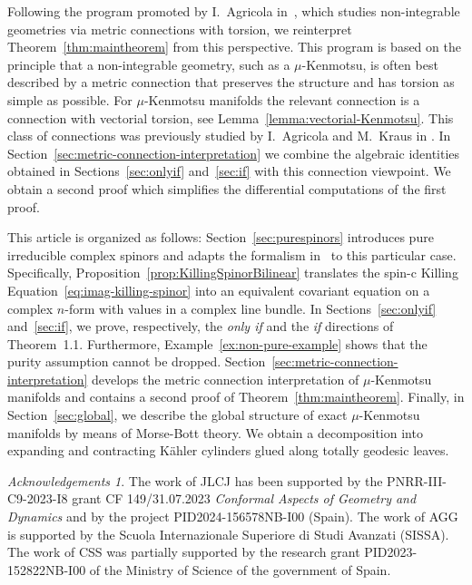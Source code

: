 \documentclass[10pt,a4paper,twoside,reqno]{amsart}
\theoremstyle{plain}
\theoremstyle{definition}
\theoremstyle{remark}
\newtheorem*{ack}{Acknowledgements}
\begin{document}
\noindent
Following the program promoted by I.~Agricola in~\cite{A2006}, which studies non-integrable geometries via metric connections with torsion, we reinterpret Theorem~\ref{thm:maintheorem} from this perspective. This program is based on the principle that a non-integrable geometry, such as a $\mu$-Kenmotsu, is often best described by a metric connection that preserves the structure and has torsion as simple as possible. For $\mu$-Kenmotsu manifolds the relevant connection is a connection with vectorial torsion, see Lemma~\ref{lemma:vectorial-Kenmotsu}. This class of connections was previously studied by I.~Agricola and M.~Kraus in \cite{AK2016}. In Section~\ref{sec:metric-connection-interpretation} we combine the algebraic identities obtained in Sections~\ref{sec:onlyif} and~\ref{sec:if} with this connection viewpoint. We obtain a second proof which simplifies the differential computations of the first proof. \medskip

\noindent
This article is organized as follows: Section~\ref{sec:purespinors} introduces pure irreducible complex spinors and adapts the formalism in~\cite{Algebraic_Complex_Square_2025,Complex_Differential_Spinors_2026} to this particular case. Specifically, Proposition~\ref{prop:KillingSpinorBilinear} translates the spin-c Killing Equation~\eqref{eq:imag-killing-spinor} into an equivalent covariant equation on a complex $n$-form with values in a complex line bundle. In Sections~\ref{sec:onlyif} and~\ref{sec:if}, we prove, respectively, the \emph{only if} and the \emph{if} directions of Theorem~1.1. Furthermore, Example~\ref{ex:non-pure-example} shows that the purity assumption cannot be dropped. Section~\ref{sec:metric-connection-interpretation} develops the metric connection interpretation of $\mu$-Kenmotsu manifolds and contains a second proof of Theorem~\ref{thm:maintheorem}. Finally, in Section~\ref{sec:global}, we describe the global structure of exact $\mu$-Kenmotsu manifolds by means of Morse-Bott theory. We obtain a decomposition into expanding and contracting Kähler cylinders glued along totally geodesic leaves.

\begin{ack}
The work of JLCJ has been supported by the PNRR-III-C9-2023-I8 grant CF 149/31.07.2023 {\em Conformal Aspects of Geometry and Dynamics} and by the project PID2024-156578NB-I00 (Spain). The work of AGG is supported by the Scuola Internazionale Superiore di Studi Avanzati (SISSA). The work of CSS was partially supported by the research grant PID2023-152822NB-I00 of the Ministry of Science of the government of Spain.
\end{ack}
\end{document}
